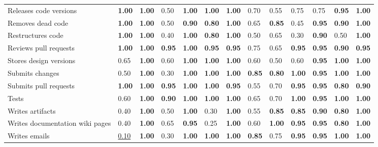 \begin{tabular}{lllllllllllll}
Releases code versions & \textbf{1.00} & \textbf{1.00} & 0.50 & \textbf{1.00} & \textbf{1.00} & \textbf{1.00} & 0.70 & 0.55 & 0.75 & 0.75 & \textbf{0.95} & \textbf{1.00} \\
Removes dead code & \textbf{1.00} & \textbf{1.00} & 0.50 & \textbf{0.90} & \textbf{0.80} & \textbf{1.00} & 0.65 & \textbf{0.85} & 0.45 & \textbf{0.95} & \textbf{0.90} & \textbf{1.00} \\
Restructures code & \textbf{1.00} & \textbf{1.00} & 0.40 & \textbf{1.00} & \textbf{0.80} & \textbf{1.00} & 0.50 & 0.65 & 0.30 & \textbf{0.90} & 0.50 & \textbf{1.00} \\
Reviews pull requests & \textbf{1.00} & \textbf{1.00} & \textbf{0.95} & \textbf{1.00} & \textbf{0.95} & \textbf{0.95} & 0.75 & 0.65 & \textbf{0.95} & \textbf{0.95} & \textbf{0.90} & \textbf{0.95} \\
Stores design versions & 0.65 & \textbf{1.00} & 0.60 & \textbf{1.00} & \textbf{1.00} & \textbf{1.00} & 0.60 & 0.50 & 0.60 & \textbf{0.95} & \textbf{1.00} & \textbf{1.00} \\
Submits changes & 0.50 & \textbf{1.00} & 0.30 & \textbf{1.00} & \textbf{1.00} & \textbf{1.00} & \textbf{0.85} & \textbf{0.80} & \textbf{1.00} & \textbf{0.95} & \textbf{1.00} & \textbf{1.00} \\
Submits pull requests & \textbf{1.00} & \textbf{1.00} & \textbf{0.95} & \textbf{1.00} & \textbf{1.00} & \textbf{0.95} & 0.55 & 0.70 & \textbf{0.95} & \textbf{0.95} & \textbf{0.80} & \textbf{0.90} \\
Tests & 0.60 & \textbf{1.00} & \textbf{0.90} & \textbf{1.00} & \textbf{1.00} & \textbf{1.00} & 0.65 & 0.70 & \textbf{1.00} & \textbf{0.95} & \textbf{1.00} & \textbf{1.00} \\
Writes artifacts & 0.40 & \textbf{1.00} & 0.50 & \textbf{1.00} & 0.30 & \textbf{1.00} & 0.55 & \textbf{0.85} & \textbf{0.85} & \textbf{0.90} & \textbf{0.80} & \textbf{1.00} \\
Writes documentation wiki pages & 0.40 & \textbf{1.00} & 0.65 & \textbf{0.95} & 0.25 & \textbf{1.00} & 0.60 & \textbf{1.00} & \textbf{0.95} & \textbf{0.95} & \textbf{0.80} & \textbf{1.00} \\
Writes emails & \underline{0.10} & \textbf{1.00} & 0.30 & \textbf{1.00} & \textbf{1.00} & \textbf{1.00} & \textbf{0.85} & 0.75 & \textbf{0.95} & \textbf{0.95} & \textbf{1.00} & \textbf{1.00} \\
\bottomrule
\end{tabular}
